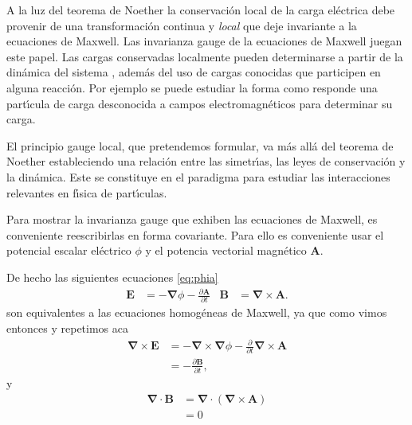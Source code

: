 A la luz del teorema de Noether la conservaci\'on local de la carga el\'ectrica debe provenir de una transformaci\'on continua y \emph{local} que deje invariante a la ecuaciones de Maxwell. Las invarianza gauge de la ecuaciones de Maxwell juegan este papel. Las cargas conservadas localmente pueden determinarse a partir de la din\'amica del sistema  \cite{Aitchison:2003tq}, adem\'as del uso de cargas conocidas que participen en alguna reacci\'on. Por ejemplo se puede estudiar la forma como responde una part\'\i cula de carga desconocida a campos electromagn\'eticos para determinar su carga. 

El principio gauge local, que pretendemos formular, va m\'as all\'a del teorema de Noether estableciendo una relaci\'on entre las simetr\'\i as, las leyes de conservaci\'on y la din\'amica. Este se constituye en el paradigma para estudiar las interacciones relevantes en f\'\i sica de part\'\i culas.

Para mostrar la invarianza gauge que exhiben las ecuaciones de Maxwell, es conveniente reescribirlas en forma covariante. Para ello es conveniente usar el potencial escalar el\'ectrico $\phi$ y el potencia vectorial magn\'etico $\mathbf{A}$.

De hecho las siguientes ecuaciones \eqref{eq:phia}
\begin{align}
  \label{eq:phia}
  \mathbf{E}&=-\boldsymbol{\nabla}\phi-\frac{\partial\mathbf{A}}{\partial t}&
  \mathbf{B}&=\boldsymbol{\nabla}\times\mathbf{A}.
\end{align}
 son equivalentes a las ecuaciones homog\'eneas de Maxwell, ya que como vimos entonces y repetimos aca
\begin{align*}
  \boldsymbol{\nabla}\times\mathbf{E}&=-\boldsymbol{\nabla}\times\boldsymbol{\nabla}\phi-\frac{\partial}{\partial t}\boldsymbol{\nabla}\times\mathbf{A}\\
  &=-\frac{\partial\mathbf{B}}{\partial t},
\end{align*}
y
\begin{align*}
  \boldsymbol{\nabla}\cdot\mathbf{B}&=\boldsymbol{\nabla}\cdot(\boldsymbol{\nabla}\times\mathbf{A})\\
  &=0
\end{align*}





